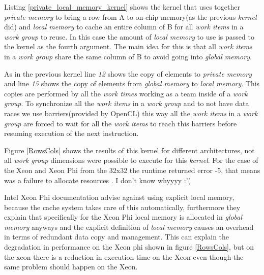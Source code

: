 
\par{Listing \ref{private_local_memory_kernel} shows the kernel that uses 
    together \emph{private memory} to bring a row from A to 
    on-chip memory(as the previous \emph{kernel} did) and 
    \emph{local memory} to cache an entire column of B for all \emph{work items} 
    in a \emph{work group} to reuse. In 
    this case the amount of \emph{local memory} to use is passed to the kernel
    as the fourth argument. The main idea for this is
    that all \emph{work items} in a \emph{work group} share the same column of 
    B to avoid going into \emph{global memory}.}

\par{As in the previous kernel line \emph{12} shows the copy of elements to 
    \emph{private memory} and line \emph{15} shows the 
    copy of elements from \emph{global memory} to \emph{local memory}. This 
    copies are performed by all the \emph{work times} working as a team inside
    of a \emph{work group}. To synchronize all the \emph{work items} in a 
    \emph{work group} and to not have data races we use barriers(provided
    by OpenCL) this way all the \emph{work items} in a \emph{work group}
    are forced to wait for all the \emph{work items} to reach this barriers 
    before resuming execution of the next instruction.}

\par{Figure \ref{RowsCols} shows the results of this kernel for different 
    architectures, not all \emph{work group} dimensions 
    were possible to execute for this \emph{kernel}. For the case of the Xeon 
    and Xeon Phi from the 32x32 the runtime returned
    error -5, that means was a failure to allocate resources\cite{opencl_error}
    .{\color{red} I don't know whyyyy :'(}}

\par{Intel Xeon Phi documentation\cite{opencl_phi} advise against using explicit
    local memory, because the cache system takes care of this automatically, 
    furthermore they explain that specifically for the Xeon Phi
    local memory is allocated in 
    \emph{global memory} anyways and the explicit definition of \emph{local
    memory} causes an overhead in terms of redundant data copy and management.
    This can explain the degradation in performance on the Xeon phi shown in
    figure \ref{RowsCols}, but on the xeon there is a reduction in execution time
    on the Xeon even though the same problem should happen on the Xeon.}

